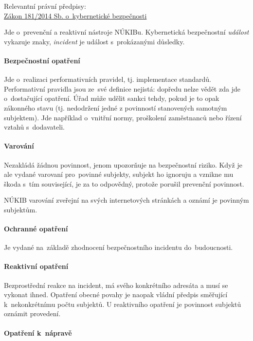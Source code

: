 {}Relevantní právní předpisy:
\\\href{https://www.zakonyprolidi.cz/cs/2014-181}{Zákon 181/2014 Sb. o~kybernetické bezpečnosti}

Jde o~prevenční a reaktivní nástroje NÚKIBu.
Kybernetická bezpečnostní \emph{událost} vykazuje znaky, \emph{incident} je událost s~prokázanými důsledky.

\paragraph{Bezpečnostní opatření}

Jde o~realizaci performativních pravidel, tj. implementace standardů.
Performativní pravidla jsou ze~své definice nejistá: dopředu nelze vědět zda jde o~dostačující opatření.
Úřad může udělit sankci tehdy, pokud je to opak zákonného stavu (tj. nedodržení jedné z povinností stanovených samotným subjektem).
Jde například o~vnitřní normy, proškolení zaměstnanců nebo řízení vztahů s~dodavateli.

\paragraph{Varování}

Nezakládá žádnou povinnost, jenom upozorňuje na bezpečnostní riziko.
Když je ale vydané varovaní pro~povinné subjekty, subjekt ho ignoruju a vznikne mu škoda s~tím související, je za to odpovědný, protože porušil prevenční povinnost.

NÚKIB varování zveřejní na svých internetových stránkách a oznámí je povinným subjektům.

\paragraph{Ochranné opatření}

Je vydané na~základě zhodnocení bezpečnostního incidentu do~budoucnosti.

\paragraph{Reaktivní opatření}

Bezprostřední reakce na incident, má svého konkrétního adresáta a musí se vykonat ihned.
Opatření obecné povahy je naopak vládní předpis směřující k~nekonkrétnímu počtu subjektů.
U reaktivního opatření je povinnost subjektů oznámit provedení.

\paragraph{Opatření k~nápravě}

